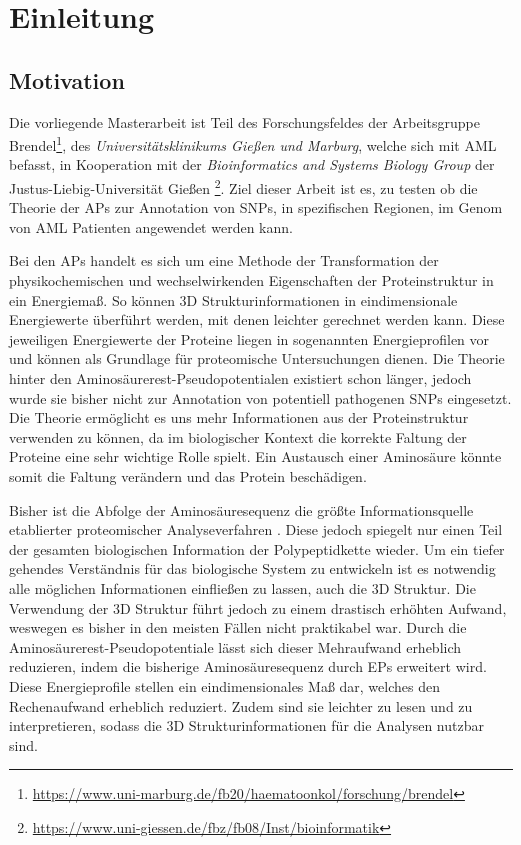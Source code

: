 \chapter{Einleitung}
\label{cha:Einleitung}

\section{Motivation}

Die vorliegende Masterarbeit ist Teil des Forschungsfeldes der Arbeitsgruppe Brendel\footnote{\url{https://www.uni-marburg.de/fb20/haematoonkol/forschung/brendel}}, des \emph{Universitätsklinikums Gießen und Marburg}, welche sich mit \ac{AML} befasst, in Kooperation mit der \emph{Bioinformatics and Systems Biology Group} der Justus-Liebig-Universität Gießen \footnote{\url{https://www.uni-giessen.de/fbz/fb08/Inst/bioinformatik}}. Ziel dieser Arbeit ist es, zu testen ob die Theorie der \ac{APs} zur Annotation von \ac{SNPs}, in spezifischen Regionen, im Genom von \ac{AML} Patienten angewendet werden kann.

Bei den \ac{APs} handelt es sich um eine Methode der Transformation der physikochemischen und wechselwirkenden Eigenschaften der Proteinstruktur in ein Energiemaß. So können 3D Strukturinformationen in eindimensionale Energiewerte überführt werden, mit denen leichter gerechnet werden kann. Diese jeweiligen Energiewerte der Proteine liegen in sogenannten Energieprofilen vor und können als Grundlage für proteomische Untersuchungen dienen. Die Theorie hinter den Aminosäurerest-Pseudopotentialen existiert schon länger, jedoch wurde sie bisher nicht zur Annotation von potentiell pathogenen \ac{SNPs} eingesetzt. Die Theorie ermöglicht es uns mehr Informationen aus der Proteinstruktur verwenden zu können, da im biologischer Kontext die korrekte Faltung der Proteine eine sehr wichtige Rolle spielt. Ein Austausch einer Aminosäure könnte somit die Faltung verändern und das Protein beschädigen. 

Bisher ist die Abfolge der Aminosäuresequenz die größte Informationsquelle etablierter proteomischer Analyseverfahren \cite{Landels.2015}. Diese jedoch spiegelt nur einen Teil der gesamten biologischen Information der Polypeptidkette wieder. Um ein tiefer gehendes Verständnis für das biologische System zu entwickeln ist es notwendig alle möglichen Informationen einfließen zu lassen, auch die 3D Struktur. Die Verwendung der 3D Struktur führt jedoch zu einem drastisch erhöhten Aufwand, weswegen es bisher in den meisten Fällen nicht praktikabel war. Durch die Aminosäurerest-Pseudopotentiale lässt sich dieser Mehraufwand erheblich reduzieren, indem die bisherige Aminosäuresequenz durch \ac{EPs} erweitert wird. Diese Energieprofile stellen ein eindimensionales Maß dar, welches den Rechenaufwand erheblich reduziert. Zudem sind sie leichter zu lesen und zu interpretieren, sodass die 3D Strukturinformationen für die Analysen nutzbar sind.

